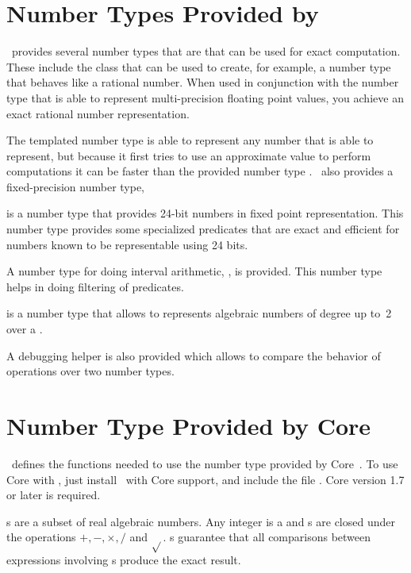 \section{Number Types Provided by \cgal}

\cgal\ provides several number types that are that can be used for 
exact computation.  These include the  class that can
be used to create, for example, a number type that behaves like a rational
number.  When used in conjunction with the number type  that
is able to represent multi-precision floating point values, you achieve
an exact rational number representation.

The templated number type  is able to represent any
number that  is able to represent, but because it first tries to use an
approximate value to perform computations it can be faster than the provided
number type .  \cgal\ also provides a fixed-precision number type,

 is a number type that provides 24-bit numbers in fixed point
representation.  This number type provides some specialized predicates
that are exact and efficient for numbers known to be representable using
24 bits.

A number type for doing interval arithmetic, , is provided.
This number type helps in doing filtering of predicates.

  is a number  type that allows to represents algebraic numbers of
degree up to~2 over a .

A debugging helper  is also provided
which allows to compare the behavior of operations over two number types.

\section{Number Type Provided by {\sc Core}}
\label{CORE}

\cgal\ defines the functions needed to use the number type 
provided by {\sc Core}~\cite{klpy-clp-99}.  To use {\sc Core} with \cgal, just
install \cgal\ with {\sc Core} support, and include the file
.  {\sc Core} version 1.7 or later is required.

s are a subset of real algebraic numbers.  Any integer is a
 and s are closed under the operations
$+,-,\times,/$ and $\sqrt{}$.  s guarantee that all
comparisons between expressions involving s produce the exact
result.

